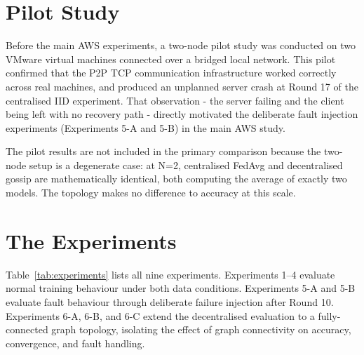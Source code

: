 \documentclass[12pt]{report}
\begin{document}
\section{Pilot Study}

Before the main AWS experiments, a two-node pilot study was conducted on two
VMware virtual machines connected over a bridged local network. This pilot
confirmed that the P2P TCP communication infrastructure worked correctly across
real machines, and produced an unplanned server crash at Round 17 of the
centralised IID experiment. That observation - the server failing and the
client being left with no recovery path - directly motivated the deliberate
fault injection experiments (Experiments 5-A and 5-B) in the main AWS study.

The pilot results are not included in the primary comparison because the
two-node setup is a degenerate case: at N=2, centralised FedAvg and
decentralised gossip are mathematically identical, both computing the average
of exactly two models. The topology makes no difference to accuracy at this
scale.

\section{The Experiments}

Table~\ref{tab:experiments} lists all nine experiments. Experiments 1--4 evaluate
normal training behaviour under both data conditions. Experiments 5-A and 5-B
evaluate fault behaviour through deliberate failure injection after Round 10.
Experiments 6-A, 6-B, and 6-C extend the decentralised evaluation to a
fully-connected graph topology, isolating the effect of graph connectivity on
accuracy, convergence, and fault handling.
\end{document}
